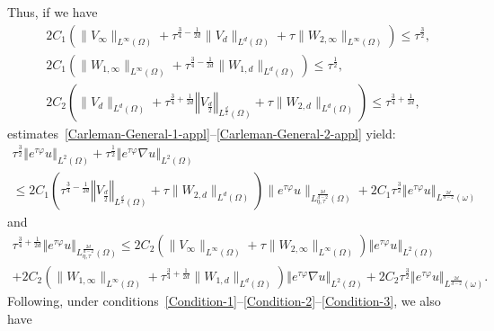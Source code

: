 \documentclass[10pt]{amsart}
\theoremstyle{definition}\newtheorem{defi}[theo]{Definition}\newtheorem{rema}[theo]{Remark}\newtheorem{exam}[theo]{Example}\newtheorem{exem}[theo]{Example}\newtheorem{nota}[theo]{Notation}
\newcommand{\norm}[1]{\left\Vert#1\right\Vert}
\renewcommand{\leq}{\leqslant}
\begin{document}
Thus, if we have
\begin{align}
& 2 C_1 \left(\| V_\infty \|_{L^\infty(\Omega)} + \tau^{\frac{3}{4}-\frac{1}{2d}} \| V_{d} \|_{L^d(\Omega)} + \tau \| W_{2, \infty}\|_{L^\infty(\Omega)} \right)
\leq \tau^{\frac{3}{2}},
\label{Condition-1}
\\
& 2 C_1 \left(\| W_{1,\infty} \|_{L^\infty(\Omega)} + \tau^{\frac{3}{4}-\frac{1}{2d}} \| W_{1,d} \|_{L^d(\Omega)} \right)
\leq \tau^{\frac{1}{2}},
\label{Condition-2}
\\
&2 C_2 \left(\| V_{d} \|_{L^d(\Omega)} + \tau^{\frac{3}{4}+\frac{1}{2d}} \norm{ V_{\frac{d}{2}}}_{L^{\frac{d}{2}}(\Omega)} + \tau \| W_{2, d}\|_{L^d(\Omega)} \right)
\leq \tau^{\frac{3}{4}+\frac{1}{2d}},
\label{Condition-3}
\end{align}
estimates~\eqref{Carleman-General-1-appl}--\eqref{Carleman-General-2-appl} yield:
\begin{multline*}
\tau^{\frac{3}{2}} \norm{ e^{\tau \varphi} u }_{L^2(\Omega)} +
\tau^{\frac{1}{2}} \norm{e^{\tau \varphi} \nabla u }_{L^2(\Omega)}\\
\leq 2C_1 \left(\tau^{\frac{3}{4}-\frac{1}{2d}} \norm{ V_{\frac{d}{2}}}_{L^{\frac{d}{2}}(\Omega)} + \tau \| W_{2, d}\|_{L^d(\Omega)} \right) 
\| e^{\tau \varphi} u \|_{L^{\frac{2d}{d-2}}_{\eta, \tau}(\Omega)}
+ 2C_1\tau^{\frac{3}{2}} \norm{e^{\tau \varphi} u}_{L^{\frac{2d}{d-2}} (\omega)}
\end{multline*}
and
\begin{multline*}
\tau^{\frac{3}{4}+\frac{1}{2d}} \norm{ e^{\tau \varphi} u }_{L^{\frac{2d}{d-2}}_{\eta,\tau} (\Omega)}
\leq 2C_2 \left(\| V_\infty \|_{L^\infty(\Omega)} + \tau \| W_{2, \infty}\|_{L^\infty(\Omega)} \right)
\norm{ e^{\tau \varphi} u }_{L^2(\Omega)}
\\
+ 2C_2 \left(\| W_{1,\infty} \|_{L^\infty(\Omega)} + \tau^{\frac{3}{4}+\frac{1}{2d}} \| W_{1,d} \|_{L^d(\Omega)} \right)
\norm{e^{\tau \varphi} \nabla u}_{L^2(\Omega)} + 2 C_2 \tau^{\frac{3}{2}} \norm{ e^{\tau \varphi} u}_{L^{\frac{2d}{d-2}} (\omega)}.
\end{multline*}
Following, under conditions~\eqref{Condition-1}--\eqref{Condition-2}--\eqref{Condition-3}, we also have
\end{document}
